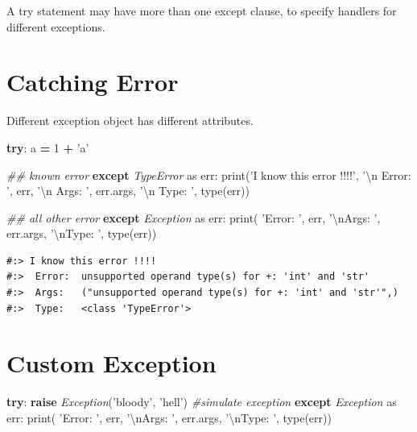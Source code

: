 \documentclass[
]{book}
\newenvironment{Shaded}{\begin{snugshade}}{\end{snugshade}}
\newcommand{\BuiltInTok}[1]{#1}
\newcommand{\CharTok}[1]{\textcolor[rgb]{0.5,0.5,0.5}{#1}}
\newcommand{\CommentTok}[1]{\textcolor[rgb]{0.37,0.37,0.37}{\textit{#1}}}
\newcommand{\ControlFlowTok}[1]{\textcolor[rgb]{0.27,0.27,0.27}{\textbf{#1}}}
\newcommand{\DecValTok}[1]{\textcolor[rgb]{0.06,0.06,0.06}{#1}}
\newcommand{\ImportTok}[1]{#1}
\newcommand{\NormalTok}[1]{#1}
\newcommand{\OperatorTok}[1]{\textcolor[rgb]{0.43,0.43,0.43}{\textbf{#1}}}
\newcommand{\PreprocessorTok}[1]{\textcolor[rgb]{0.37,0.37,0.37}{\textit{#1}}}
\newcommand{\StringTok}[1]{\textcolor[rgb]{0.5,0.5,0.5}{#1}}
\begin{document}
A try statement may have more than one except clause, to specify handlers for different exceptions.

\hypertarget{catching-error}{%
\section{Catching Error}\label{catching-error}}

Different exception object has different attributes.

\begin{Shaded}
\begin{Highlighting}[]
\ControlFlowTok{try}\NormalTok{:}
\NormalTok{  a }\OperatorTok{=} \DecValTok{1} \OperatorTok{+} \StringTok{'a'}
  
\CommentTok{## known error  }
\ControlFlowTok{except} \PreprocessorTok{TypeError} \ImportTok{as}\NormalTok{ err:}
  \BuiltInTok{print}\NormalTok{(}\StringTok{'I know this error !!!!'}\NormalTok{,}
        \StringTok{'}\CharTok{\textbackslash{}n}\StringTok{ Error: '}\NormalTok{, err,}
        \StringTok{'}\CharTok{\textbackslash{}n}\StringTok{ Args:  '}\NormalTok{, err.args,}
        \StringTok{'}\CharTok{\textbackslash{}n}\StringTok{ Type:  '}\NormalTok{, }\BuiltInTok{type}\NormalTok{(err))}

\CommentTok{## all other error}
\ControlFlowTok{except} \PreprocessorTok{Exception} \ImportTok{as}\NormalTok{ err:}
  \BuiltInTok{print}\NormalTok{( }\StringTok{'Error: '}\NormalTok{, err,}
         \StringTok{'}\CharTok{\textbackslash{}n}\StringTok{Args:  '}\NormalTok{, err.args,}
         \StringTok{'}\CharTok{\textbackslash{}n}\StringTok{Type:  '}\NormalTok{, }\BuiltInTok{type}\NormalTok{(err))}
\end{Highlighting}
\end{Shaded}

\begin{verbatim}
#:> I know this error !!!! 
#:>  Error:  unsupported operand type(s) for +: 'int' and 'str' 
#:>  Args:   ("unsupported operand type(s) for +: 'int' and 'str'",) 
#:>  Type:   <class 'TypeError'>
\end{verbatim}

\hypertarget{custom-exception}{%
\section{Custom Exception}\label{custom-exception}}

\begin{Shaded}
\begin{Highlighting}[]
\ControlFlowTok{try}\NormalTok{:}
  \ControlFlowTok{raise} \PreprocessorTok{Exception}\NormalTok{(}\StringTok{'bloody'}\NormalTok{, }\StringTok{'hell'}\NormalTok{)  }\CommentTok{#simulate exception}
\ControlFlowTok{except} \PreprocessorTok{Exception} \ImportTok{as}\NormalTok{ err:}
  \BuiltInTok{print}\NormalTok{( }\StringTok{'Error: '}\NormalTok{, err,}
         \StringTok{'}\CharTok{\textbackslash{}n}\StringTok{Args:  '}\NormalTok{, err.args,}
         \StringTok{'}\CharTok{\textbackslash{}n}\StringTok{Type:  '}\NormalTok{, }\BuiltInTok{type}\NormalTok{(err))}
\end{Highlighting}
\end{Shaded}
\end{document}
